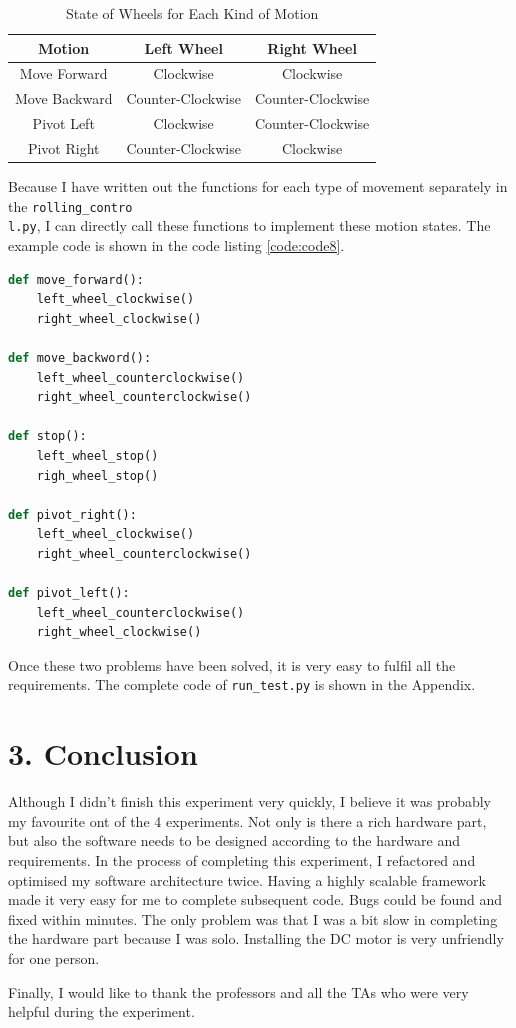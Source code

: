 \documentclass[12pt]{report}
\newcommand{\code}[1]{\colorbox{light-gray}{\texttt{#1}}}
\begin{document}
\begin{table}[H]
\centering
 \caption{State of Wheels for Each Kind of Motion}
 \label{table: table2}
 \begin{tabular}{|c| c| c |} 
 \hline
 Motion & Left Wheel & Right Wheel  \\ [0.5ex] 
 \hline
 Move Forward &  Clockwise &  Clockwise\\ 
 \hline
 Move Backward &  Counter-Clockwise &  Counter-Clockwise\\ 
 \hline
 Pivot Left & Clockwise &  Counter-Clockwise\\
 \hline
 Pivot Right & Counter-Clockwise &  Clockwise\\
 \hline
 \end{tabular}
\end{table}\vspace{-2em}
Because I have written out the functions for each type of movement separately in the \code{rolling\_contro}\\\code{l.py}, I can directly call these functions to implement these motion states. The example code is shown in the code listing \ref{code:code8}.
\begin{center}
\begin{lstlisting}[language=Python, label=code:code8, caption= Example Implementation of Motion Control] 
def move_forward():
    left_wheel_clockwise()
    right_wheel_clockwise()
    
def move_backword():
    left_wheel_counterclockwise()
    right_wheel_counterclockwise()

def stop():
    left_wheel_stop()
    righ_wheel_stop()

def pivot_right():
    left_wheel_clockwise() 
    right_wheel_counterclockwise()

def pivot_left():
    left_wheel_counterclockwise()
    right_wheel_clockwise()
\end{lstlisting}
\end{center}\vspace{-2em}
Once these two problems have been solved, it is very easy to fulfil all the requirements. The complete code of \code{run\_test.py} is shown in the Appendix.\vspace{-1em}
\section*{3. Conclusion}\vspace{-1em}
Although I didn't finish this experiment very quickly, I believe it was probably my favourite ont of the 4 experiments. Not only is there a rich hardware part, but also the software needs to be designed according to the hardware and requirements. In the process of completing this experiment, I refactored and optimised my software architecture twice. Having a highly scalable framework made it very easy for me to complete subsequent code. Bugs could be found and fixed within minutes. The only problem was that I was a bit slow in completing the hardware part because I was solo. Installing the DC motor is very unfriendly for one person. \par
Finally, I would like to thank the professors and all the TAs who were very helpful during the experiment. 
\end{document}
